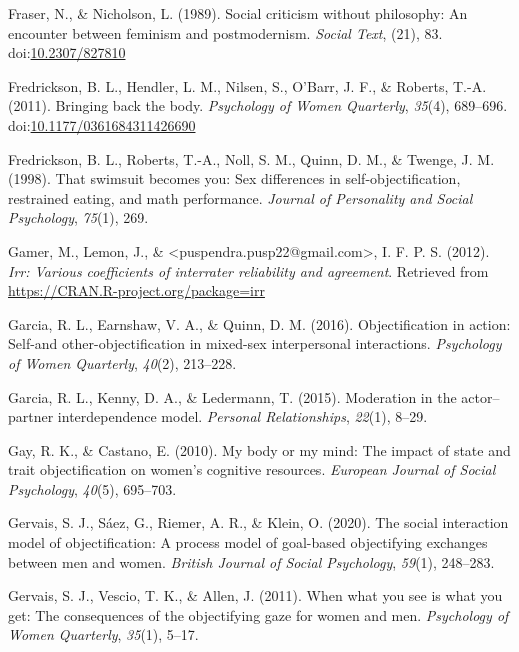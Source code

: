 \documentclass[man]{apa6}
\begin{document}
\hypertarget{ref-frasernicholson1989}{}
Fraser, N., \& Nicholson, L. (1989). Social criticism without
philosophy: An encounter between feminism and postmodernism.
\emph{Social Text}, (21), 83.
doi:\href{https://doi.org/10.2307/827810}{10.2307/827810}

\hypertarget{ref-fredricksonetal2011}{}
Fredrickson, B. L., Hendler, L. M., Nilsen, S., O'Barr, J. F., \&
Roberts, T.-A. (2011). Bringing back the body. \emph{Psychology of Women
Quarterly}, \emph{35}(4), 689--696.
doi:\href{https://doi.org/10.1177/0361684311426690}{10.1177/0361684311426690}

\hypertarget{ref-fredrickson1998swimsuit}{}
Fredrickson, B. L., Roberts, T.-A., Noll, S. M., Quinn, D. M., \&
Twenge, J. M. (1998). That swimsuit becomes you: Sex differences in
self-objectification, restrained eating, and math performance.
\emph{Journal of Personality and Social Psychology}, \emph{75}(1), 269.

\hypertarget{ref-R-irr}{}
Gamer, M., Lemon, J., \&
\textless{}puspendra.pusp22@gmail.com\textgreater{}, I. F. P. S. (2012).
\emph{Irr: Various coefficients of interrater reliability and
agreement}. Retrieved from \url{https://CRAN.R-project.org/package=irr}

\hypertarget{ref-garcia2016objectification}{}
Garcia, R. L., Earnshaw, V. A., \& Quinn, D. M. (2016). Objectification
in action: Self-and other-objectification in mixed-sex interpersonal
interactions. \emph{Psychology of Women Quarterly}, \emph{40}(2),
213--228.

\hypertarget{ref-garcia2015moderation}{}
Garcia, R. L., Kenny, D. A., \& Ledermann, T. (2015). Moderation in the
actor--partner interdependence model. \emph{Personal Relationships},
\emph{22}(1), 8--29.

\hypertarget{ref-gay2010my}{}
Gay, R. K., \& Castano, E. (2010). My body or my mind: The impact of
state and trait objectification on women's cognitive resources.
\emph{European Journal of Social Psychology}, \emph{40}(5), 695--703.

\hypertarget{ref-gervais2020social}{}
Gervais, S. J., Sáez, G., Riemer, A. R., \& Klein, O. (2020). The social
interaction model of objectification: A process model of goal-based
objectifying exchanges between men and women. \emph{British Journal of
Social Psychology}, \emph{59}(1), 248--283.

\hypertarget{ref-gervais2011you}{}
Gervais, S. J., Vescio, T. K., \& Allen, J. (2011). When what you see is
what you get: The consequences of the objectifying gaze for women and
men. \emph{Psychology of Women Quarterly}, \emph{35}(1), 5--17.
\end{document}
